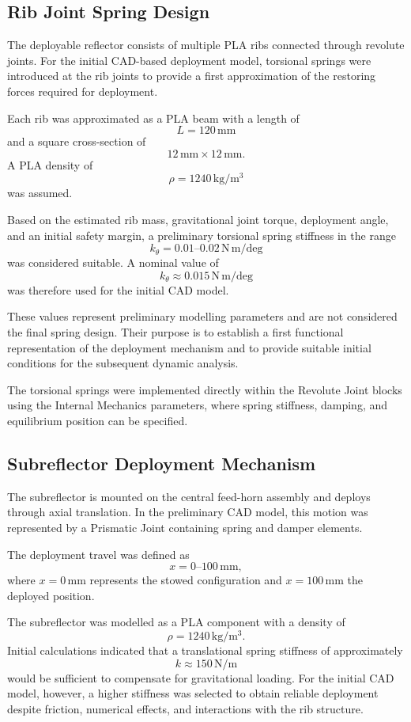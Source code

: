 \subsection{Rib Joint Spring Design}

The deployable reflector consists of multiple PLA ribs connected through revolute joints. For the initial CAD-based deployment model, torsional springs were introduced at the rib joints to provide a first approximation of the restoring forces required for deployment.

Each rib was approximated as a PLA beam with a length of
\[
L=120\,\mathrm{mm}
\]
and a square cross-section of
\[
12\,\mathrm{mm}\times12\,\mathrm{mm}.
\]
A PLA density of
\[
\rho=1240\,\mathrm{kg/m^3}
\]
was assumed.

Based on the estimated rib mass, gravitational joint torque, deployment angle, and an initial safety margin, a preliminary torsional spring stiffness in the range
\[
k_\theta=0.01\text{--}0.02\,\mathrm{N\,m/deg}
\]
was considered suitable. A nominal value of
\[
k_\theta\approx0.015\,\mathrm{N\,m/deg}
\]
was therefore used for the initial CAD model.

These values represent preliminary modelling parameters and are not considered the final spring design. Their purpose is to establish a first functional representation of the deployment mechanism and to provide suitable initial conditions for the subsequent dynamic analysis.

The torsional springs were implemented directly within the Revolute Joint blocks using the Internal Mechanics parameters, where spring stiffness, damping, and equilibrium position can be specified.

\subsection{Subreflector Deployment Mechanism}

The subreflector is mounted on the central feed-horn assembly and deploys through axial translation. In the preliminary CAD model, this motion was represented by a Prismatic Joint containing spring and damper elements.

The deployment travel was defined as
\[
x=0\text{--}100\,\mathrm{mm},
\]
where $x=0\,\mathrm{mm}$ represents the stowed configuration and $x=100\,\mathrm{mm}$ the deployed position.

The subreflector was modelled as a PLA component with a density of
\[
\rho=1240\,\mathrm{kg/m^3}.
\]
Initial calculations indicated that a translational spring stiffness of approximately
\[
k\approx150\,\mathrm{N/m}
\]
would be sufficient to compensate for gravitational loading. For the initial CAD model, however, a higher stiffness was selected to obtain reliable deployment despite friction, numerical effects, and interactions with the rib structure.

